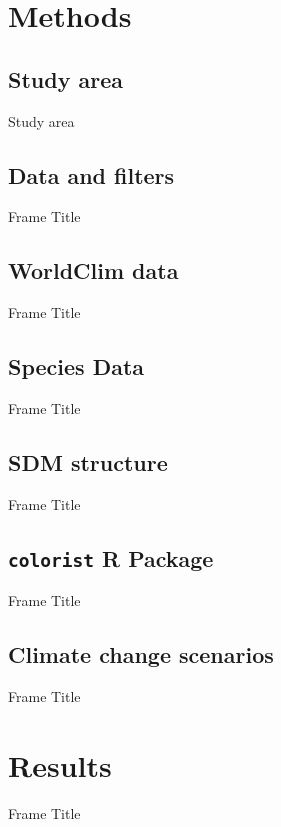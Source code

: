 \documentclass{beamer}
\begin{document}
\section{Methods}
\subsection{Study area}
\begin{frame}{Study area}
    
\end{frame}
\subsection{Data and filters}
\begin{frame}{Frame Title}
    
\end{frame}
\subsection{WorldClim data}
\begin{frame}{Frame Title}
    
\end{frame}
\subsection{Species Data}
\begin{frame}{Frame Title}
    
\end{frame}
\subsection{SDM structure}
\begin{frame}{Frame Title}
    
\end{frame}
\subsection{\texttt{colorist} R Package}
\begin{frame}{Frame Title}
    
\end{frame}
\subsection{Climate change scenarios}
\begin{frame}{Frame Title}
    
\end{frame}
\section{Results}
\begin{frame}{Frame Title}
    
\end{frame}
\end{document}
